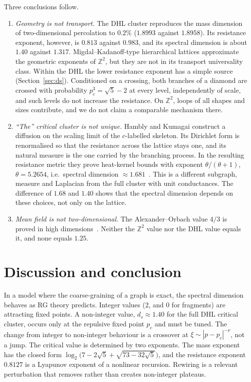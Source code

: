 \documentclass[11pt]{article}
\theoremstyle{remark}\newtheorem*{remark}{Remark}
\newcommand{\ZZ}{\mathbb{Z}}
\begin{document}
Three conclusions follow.
\begin{enumerate}
\item \emph{Geometry is not transport.} The DHL cluster reproduces the mass dimension of two-dimensional percolation
to $0.2\%$ ($1.8993$ against $1.8958$). Its resistance exponent, however, is $0.813$ against $0.983$, and its spectral
dimension is about $1.40$ against $1.317$. Migdal--Kadanoff-type hierarchical lattices approximate the geometric
exponents of $\ZZ^2$, but they are not in its transport universality class. Within the DHL the lower resistance
exponent has a simple source (Section~\ref{sec:ds}). Conditioned on a crossing, both branches of a diamond are crossed
with probability $p_c^3=\sqrt5-2$ at every level, independently of scale, and such levels do not increase the
resistance. On $\ZZ^2$, loops of all shapes and sizes contribute, and we do not claim a comparable mechanism there.
\item \emph{``The'' critical cluster is not unique.} Hambly and Kumagai construct a diffusion on the scaling limit of the
$c$-labelled skeleton. Its Dirichlet form is renormalised so that the resistance across the lattice stays one, and its
natural measure is the one carried by the branching process. In the resulting resistance metric they prove heat-kernel
bounds with exponent $\theta/(\theta+1)$, $\theta=5.2654$, i.e.\ spectral dimension $\approx1.681$~\cite{HamblyKumagai}. This
is a different subgraph, measure and Laplacian from the full cluster with unit conductances. The difference of
$1.68$ and $1.40$ shows that the spectral dimension depends on these choices, not only on the lattice.
\item \emph{Mean field is not two-dimensional.} The Alexander--Orbach value $4/3$ is proved in high
dimensions~\cite{KozmaNachmias}. Neither the $\ZZ^2$ value nor the DHL value equals it, and none equals $1.25$.
\end{enumerate}

\section{Discussion and conclusion}
\label{sec:conclusion}

In a model where the coarse-graining of a graph is exact, the spectral dimension behaves as RG theory predicts. Integer
values ($2$, and $0$ for fragments) are attracting fixed points. A non-integer value, $d_s\approx1.40$ for the full DHL
critical cluster, occurs only at the repulsive fixed point $p_c$ and must be tuned. The change from integer to
non-integer behaviour is a crossover at $\xi\sim|p-p_c|^{-\nu}$, not a jump. The critical value is determined by two
exponents. The mass exponent has the closed form $\log_2\bigl(7-2\sqrt5+\sqrt{73-32\sqrt5}\bigr)$, and the resistance exponent
$0.8127$ is a Lyapunov exponent of a nonlinear recursion. Rewiring is a relevant perturbation that removes rather than
creates non-integer plateaus.
\end{document}

